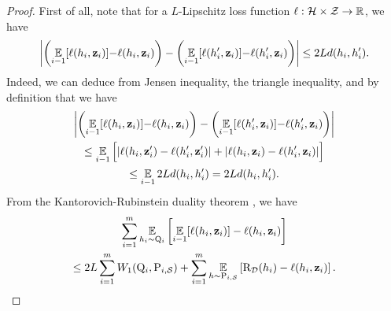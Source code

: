 \begin{noaddcontents}
    \theoremonlineht*
    \begin{proof}
    First of all, note that for a $L$-Lipschitz loss function $\ell: \mathcal{H}\times\mathcal{Z}\to\mathbb{R}$, we have
    \begin{align}
    \left\vert\left( \operatorname*{\mathbb{E}}_{i-1}[\ell(h_i,\mathbf{z}_i)]{-}\ell(h_i, \mathbf{z}_i)\right) - \left( \operatorname*{\mathbb{E}}_{i-1}[\ell(h'_i,\mathbf{z}_i)]{-}\ell(h'_i, \mathbf{z}_i)\right)\right\vert \le 2Ld(h_i, h'_i).\label{eq:proof-online-ht-1}
    \end{align}
    Indeed, we can deduce  from Jensen inequality, the triangle inequality, and by definition that we have
    \begin{multline*}
    \left\vert\left(\operatorname*{\mathbb{E}}_{i-1}[\ell(h_i,\mathbf{z}_i)]{-}\ell(h_i, \mathbf{z}_i)\right) - \left(\operatorname*{\mathbb{E}}_{i-1}[\ell(h'_i,\mathbf{z}_i)]{-}\ell(h'_i, \mathbf{z}_i)\right)\right\vert \\ 
    \le \operatorname*{\mathbb{E}}_{i-1}\Big[ |\ell(h_i, \mathbf{z}'_i)-\ell(h'_i, \mathbf{z}'_i)|+|\ell(h_i, \mathbf{z}_i)-\ell(h'_i, \mathbf{z}_i)|\Big]\\
     \le \operatorname*{\mathbb{E}}_{i-1} 2Ld(h_i, h'_i) = 2Ld(h_i, h'_i).
    \end{multline*}
    From the Kantorovich-Rubinstein duality theorem \cite[Remark 6.5]{villani2009optimal}, we have
    \begin{multline*}
    \sum_{i=1}^{m}\operatorname*{\mathbb{E}}_{h_i\sim\mathrm{Q}_{i}}\left[\operatorname*{\mathbb{E}}_{i-1}[\ell(h_i,\mathbf{z}_i)]-\ell(h_i, \mathbf{z}_i) \right] \\ \le 2L\sum_{i=1}^{m}W_1(\mathrm{Q}_{i}, \mathrm{P}_{i,\mathcal{S}}) + \sum_{i=1}^{m}\operatorname*{\mathbb{E}}_{h\sim\mathrm{P}_{i,\mathcal{S}}}\left[\text{R}_{\mathcal{D}}(h_i)-\ell(h_i, \mathbf{z}_i) \right].
    \end{multline*}
    

\end{proof}
\end{noaddcontents}
